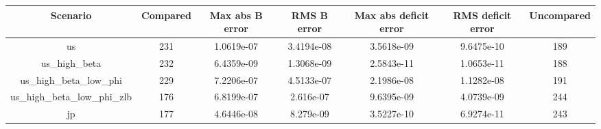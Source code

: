\begin{table}[!ht]
\setlength\tabcolsep{0.425em}
\setlength\aboverulesep{0pt}
\setlength\belowrulesep{0.2em}
\centering
\begin{threeparttable}
\begin{tabular}{ccccccc}
\toprule[0.1em]
Scenario & Compared & Max abs B error & RMS B error & Max abs deficit error & RMS deficit error & Uncompared \\[0.2em]
\midrule[0.075em]
us & 231 & 1.0619e-07 & 3.4194e-08 & 3.5618e-09 & 9.6475e-10 & 189 \\[0.2em]
us\_high\_beta & 232 & 6.4359e-09 & 1.3068e-09 & 2.5843e-11 & 1.0653e-11 & 188 \\[0.2em]
us\_high\_beta\_low\_phi & 229 & 7.2206e-07 & 4.5133e-07 & 2.1986e-08 & 1.1282e-08 & 191 \\[0.2em]
us\_high\_beta\_low\_phi\_zlb & 176 & 6.8199e-07 & 2.616e-07 & 9.6395e-09 & 4.0739e-09 & 244 \\[0.2em]
jp & 177 & 4.6446e-08 & 8.279e-09 & 3.5227e-10 & 6.9274e-11 & 243 \\[0.2em]
\bottomrule[0.1em]
\end{tabular}
\end{threeparttable}
\end{table}
